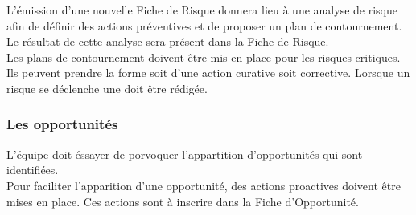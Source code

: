 L'émission d'une nouvelle Fiche de Risque donnera lieu à une analyse de risque afin de définir des actions préventives et de proposer un plan de contournement. Le résultat de cette analyse sera présent dans la Fiche de Risque. \\

Les plans de contournement doivent être mis en place pour les risques critiques. Ils peuvent prendre la forme soit d’une action curative soit corrective. Lorsque un risque se déclenche une \FFT{} doit être rédigée. \\ 

\subsubsection*{Les opportunités}

L'équipe \PICCourt doit éssayer de porvoquer l'appartition d'opportunités qui sont identifiées. \\ 

Pour faciliter l'apparition d'une opportunité, des actions proactives doivent être mises en place. Ces actions sont à inscrire dans la Fiche d'Opportunité.

